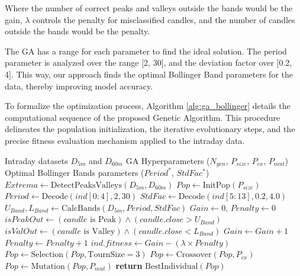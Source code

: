 \documentclass{ieeeaccess}
\begin{document}
Where the number of correct peaks and valleys outside the bands would be the gain, $\lambda$ controls the penalty for misclassified candles, and the number of candles outside the bands would be the penalty. 

The GA has a range for each parameter to find the ideal solution. The period parameter is analyzed over the range [2, 30], and the deviation factor over [0.2, 4]. This way, our approach finds the optimal Bollinger Band parameters for the data, thereby improving model accuracy.


To formalize the optimization process, Algorithm \ref{alg:ga_bollinger} details the computational sequence of the proposed Genetic Algorithm. This procedure delineates the population initialization, the iterative evolutionary steps, and the precise fitness evaluation mechanism applied to the intraday data.


\begin{algorithm}[t]
\caption{Genetic Algorithm for Bollinger Bands Parameter Optimization}
\label{alg:ga_bollinger}
\begin{algorithmic}[1]
\REQUIRE Intraday datasets $D_{5m}$ and $D_{60m}$
\REQUIRE GA Hyperparameters ($N_{gen}$, $P_{size}$, $P_{cx}$, $P_{mut}$)
\ENSURE Optimal Bollinger Bands parameters ($Period^*$, $StdFac^*$)
\STATE $Extrema \leftarrow \text{DetectPeaksValleys}(D_{5m}, D_{60m})$
\STATE $Pop \leftarrow \text{InitPop}(P_{size})$ 
        \STATE $Period \leftarrow \text{Decode}(ind[0:4], 2, 30)$
        \STATE $StdFac \leftarrow \text{Decode}(ind[5:13], 0.2, 4.0)$
        \STATE $U_{Band}, L_{Band} \leftarrow \text{CalcBands}(D_{5m}, Period, StdFac)$
        \STATE $Gain \leftarrow 0$, $Penalty \leftarrow 0$
                \STATE $isPeakOut \leftarrow (candle \text{ is Peak}) \land (candle.close > U_{Band})$
                \STATE $isValOut \leftarrow (candle \text{ is Valley}) \land (candle.close < L_{Band})$
                    \STATE $Gain \leftarrow Gain + 1$
                \ENDIF
            \ELSE
                    \STATE $Penalty \leftarrow Penalty + 1$
                \ENDIF
            \ENDIF
        \ENDFOR
        \STATE $ind.fitness \leftarrow Gain - (\lambda \times Penalty)$
    \ENDFOR
    \STATE $Pop \leftarrow \text{Selection}(Pop, \text{TournSize}=3)$
    \STATE $Pop \leftarrow \text{Crossover}(Pop, P_{cx})$
    \STATE $Pop \leftarrow \text{Mutation}(Pop, P_{mut})$
\ENDFOR
\STATE \textbf{return} $\text{BestIndividual}(Pop)$
\end{algorithmic}
\end{algorithm}
\end{document}
